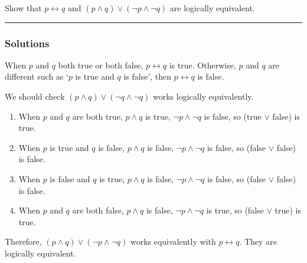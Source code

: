 \newpage
\begin{question}
Show that $p \leftrightarrow q$ and $(p \land q) \lor (\neg p \land \neg q)$ are logically equivalent.
\end{question}

\par\noindent\rule{\textwidth}{0.5pt}

\subsubsection*{Solutions}

\indent
When $p$ and $q$ both true or both false, $p \leftrightarrow q$ is true. Otherwise, $p$ and $q$ are different such as `$p$ is true and $q$ is false', then $p \leftrightarrow q$ is false.
\bigskip

\noindent We should check $(p \wedge q) \vee (\neg q \wedge \neg q)$ works logically equivalently.
\begin{enumerate}
    \item When $p$ and $q$ are both true, $p \wedge q$ is true, $\neg p \wedge \neg q$ is false, so (true $\vee$ false) is true.
    \item When $p$ is true and $q$ is false, $p \wedge q$ is false, $\neg p \wedge \neg q$ is false, so (false $\vee$ false) is false.
    \item When $p$ is false and $q$ is true, $p \wedge q$ is false, $\neg p \wedge \neg q$ is false, so (false $\vee$ false) is false.
    \item When $p$ and $q$ are both false, $p \wedge q$ is false, $\neg p \wedge \neg q$ is true, so (false $\vee$ true) is true.
\end{enumerate}
\noindent Therefore, $(p \wedge q) \vee (\neg p \wedge \neg q)$ works equivalently with $p \leftrightarrow q$. They are logically equivalent.


